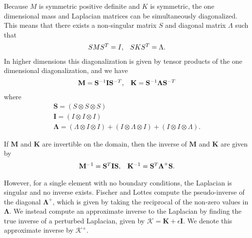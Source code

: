 Because $M$ is symmetric positive definite and $K$ is symmetric, the one dimensional mass and Laplacian matrices can be simultaneously diagonalized.
This means that there exists a non-singular matrix $S$ and diagonal matrix $\Lambda$ such that
\begin{equation}
\begin{array}{c c}
S M S^T = I,  &  S K S^T = \Lambda.
\end{array}
\end{equation}
In higher dimensions this diagonalization is given by tensor products of the one dimensional diagonalization, and we have
\begin{equation}
\begin{array}{c c}
\mathbf{M}   = \mathbf{S}^{-1} \mathbf{I} \mathbf{S}^{-T},  &  \mathbf{K} = \mathbf{S}^{-1} \boldsymbol{\Lambda} \mathbf{S}^{-T}  \\
\end{array}
\end{equation}
where
\begin{equation}
\begin{array}{c}
\mathbf{S}       = \left( S \otimes S \otimes S \right)  \\
\mathbf{I}       = \left( I \otimes I \otimes I \right)  \\
\boldsymbol{\Lambda} = \left( \Lambda \otimes I \otimes I \right) + \left( I \otimes \Lambda \otimes I \right) + \left( I \otimes I \otimes \Lambda \right).
\end{array}
\end{equation}

If $\mathbf{M}$ and $\mathbf{K}$ are invertible on the domain, then the inverse of $\mathbf{M}$ and $\mathbf{K}$ are given by
\begin{equation}
\begin{array}{c c}
\mathbf{M}^{-1} = \mathbf{S}^T \mathbf{I} \mathbf{S},  &  \mathbf{K}^{-1} = \mathbf{S}^T \boldsymbol{\Lambda}^{+} \mathbf{S}.
\end{array}
\end{equation}

However, for a single element with no boundary conditions, the Laplacian is singular and no inverse exists.
Fischer and Lottes \cite{fischer2005hybrid} compute the pseudo-inverse of the diagonal $\boldsymbol{\Lambda}^{+}$, which is given by taking the reciprocal of the non-zero values in $\boldsymbol{\Lambda}$.
We instead compute an approximate inverse to the Laplacian by finding the true inverse of a perturbed Laplacian, given by $\boldsymbol{\mathcal{K}} = \mathbf{K} + \epsilon \mathbf{I}$.
We denote this approximate inverse by $\boldsymbol{\mathcal{K}}^+$.

